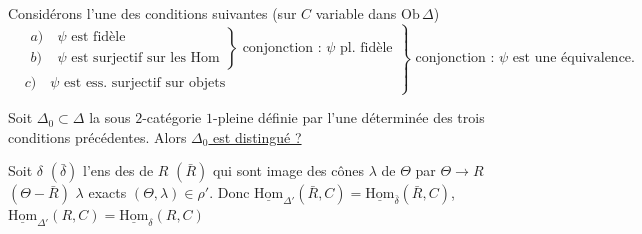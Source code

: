 Considérons l'une des conditions suivantes (sur $C$ variable dans $\mathrm{Ob}\,\Delta$)
\[
\left.\begin{aligned}
&\left.\begin{aligned}a)&\ \psi\text{ est fidèle}\\ b)&\ \psi\text{ est surjectif sur les Hom}\end{aligned}\right\}
\text{ conjonction : }\psi\text{ pl. fidèle}\\
&c)\quad\psi\text{ est ess. surjectif sur objets}
\end{aligned}\right\}\text{ conjonction : }\psi\text{ est une équivalence.}
\]

Soit $\Delta_0\subset\Delta$ la sous $2$-catégorie $1$-pleine définie par l'une déterminée des trois conditions précédentes. Alors \uline{$\Delta_0$ est distingué ?}

Soit \deleted{\unsure{$\varphi$|$\Delta$}} $\delta$ $(\bar\delta)$ l'ens des  de $R$ $(\bar R)$ qui sont image des  cônes $\lambda$  de $\Theta$ par $\Theta\to R$ $(\Theta-\bar R)$ $\lambda$ exacts  $(\Theta,\lambda)\in\rho'$. Donc $\underline{\mathrm{Hom}}_{\Delta'}(\bar R,C)=\underline{\mathrm{Hom}}_{\bar\delta}(\bar R,C)$, $\underline{\mathrm{Hom}}_{\Delta'}(R,C)=\underline{\mathrm{Hom}}_\delta(R,C)$

